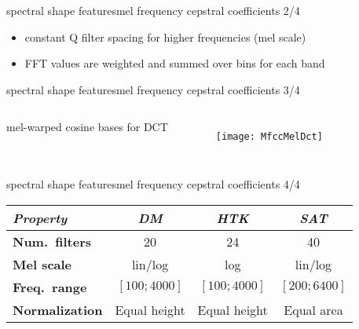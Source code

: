 		\begin{frame}{spectral shape features}{mel frequency cepstral coefficients 2/4}
            
            \begin{itemize}
                \item   constant Q filter spacing for higher frequencies (mel scale)
                \item   FFT values are weighted and summed over bins for each band
            \end{itemize}
		\end{frame}
		\begin{frame}{spectral shape features}{mel frequency cepstral coefficients 3/4}
            \begin{columns}
                    mel-warped cosine bases for DCT
			\vspace{-11mm}
                    \begin{figure}
                        \centering
                        \texttt{[image: MfccMelDct]}
                        \label{fig:MfccMelDct}
                    \end{figure}
            \end{columns}
		\end{frame}
		\begin{frame}{spectral shape features}{mel frequency cepstral coefficients 4/4}
			\vspace{-6mm}
            \begin{footnotesize}
			\begin{table}
				\centering
				\begin{tabular*}{\textwidth}{@{\extracolsep{\fill}}lccc}%
                    \\ \hline
                    \bf{\emph{Property}}	 & \bf{\emph{DM}}	 & \bf{\emph{HTK}}	 & \bf{\emph{SAT}}\\ 
                     \hline
                    \bf{Num.\ filters}	 & 20	 & 24	 & 40\\
                    \bf{Mel scale}	 & lin/log	 & log	 & lin/log\\
                    \bf{Freq.\ range}	 & $[100; 4000]$	 & $[100; 4000]$	 & $[200; 6400]$\\
                    \bf{Normalization}	 & Equal height	 & Equal height	 & Equal area\\
				\end{tabular*}
			\end{table}
			\end{footnotesize}

            \vspace{-5mm}
		\end{frame}

